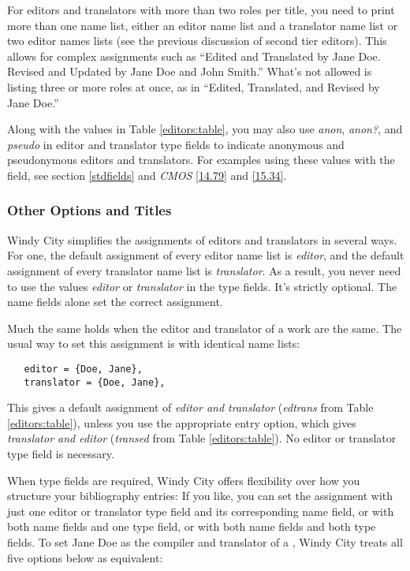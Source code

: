 \documentclass[11pt,letterpaper,oneside]{article}
\begin{document}
For editors and translators with more than two roles per title, you
need to print more than one name list, either an editor name list and
a translator name list or two editor names lists (see the previous
discussion of second tier editors). This allows for complex
assignments such as ``Edited and Translated by Jane Doe. Revised and
Updated by Jane Doe and John Smith.'' What's not allowed is listing
three or more roles at once, as in ``Edited, Translated, and Revised
by Jane Doe.''

Along with the values in Table \ref{editors:table}, you may also use
\textit{anon}, \textit{anon?}, and \textit{pseudo} in editor and
translator type fields to indicate anonymous and pseudonymous editors
and translators. For examples using these values with the
 field, see section \ref{stdfields} and
\textit{CMOS} \ref{14.79} and \ref{15.34}.

\subsubsection{Other Options and Titles}
\label{editors:other}

Windy City simplifies the assignments of editors and translators in
several ways. For one, the default assignment of every editor name
list is \textit{editor}, and the default assignment of every
translator name list is \textit{translator}. As a result, you never
need to use the values \textit{editor} or \textit{translator} in the
type fields. It's strictly optional. The name fields alone set the
correct assignment.

Much the same holds when the editor and translator of a work are the
same. The usual way to set this assignment is with identical name
lists:

\begin{verbatim}
   editor = {Doe, Jane},
   translator = {Doe, Jane},
\end{verbatim}

\noindent This gives a default assignment of \textit{editor and
translator} (\textit{edtrans} from Table \ref{editors:table}), unless you
use the appropriate  entry option, which gives
\textit{translator and editor} (\textit{transed} from Table
\ref{editors:table}). No editor or translator type field is necessary.

When type fields are required, Windy City offers flexibility over how
you structure your bibliography entries: If you like, you can set the
assignment with just one editor or translator type field and its
corresponding name field, or with both name fields and one type field,
or with both name fields and both type fields. To set Jane Doe as the
compiler and translator of a , Windy City treats all
five options below as equivalent:
\end{document}
